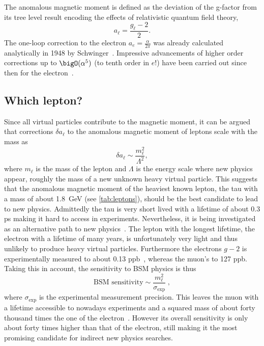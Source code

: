 The anomalous magnetic moment is defined as the deviation of the g-factor from its tree level result encoding the effects of relativistic quantum field theory,
\begin{equation}
a_{\ell} = \frac{g_{\ell}-2}{2}.
\end{equation}
The one-loop correction to the electron $a_{e} = \frac{\alpha}{2 \pi}$ was already calculated analytically in 1948 by Schwinger~\cite{Schwinger:1948}.
Impressive advancements of higher order corrections up to $\bigO(\alpha^{5})$ (\ie to tenth order in $e$!) have been carried out since then for the electron~\cite{laporta1996analytical,PhysRevLett.109.111807,PhysRevD.91.033006,nio2015qed}.

\subsection{Which lepton?}

Since all virtual particles contribute to the magnetic moment, it can be argued~\cite{osti_4382322} that corrections $\delta a_{\ell}$ to the anomalous magnetic moment of leptons scale with the mass as
\begin{equation}
\delta a_{\ell} \sim \frac{m_{\ell}^{2}}{\Lambda^{2}},
\end{equation}
where $m_{\ell}$ is the mass of the lepton and $\Lambda$ is the energy scale where new physics appear, \ie roughly the mass of a new unknown heavy virtual particle.
This suggests that the anomalous magnetic moment of the heaviest known lepton, the tau with a mass of about \SI{1.8}{\GeV} (see \cref{tab:leptons}), should be the best candidate to lead to new physics.
Admittedly the tau is very short lived with a lifetime of about \num{0.3} ps making it hard to access in experiments.
Nevertheless, it is being investigated as an alternative path to new physics~\cite{Fael:2013ij,BaBar:2015ard}.
The lepton with the longest lifetime, the electron with a lifetime of many years, is unfortunately very light and thus unlikely to produce heavy virtual particles.
Furthermore the electrons $g-2$ is experimentally measured to about \num{0.13} ppb~\cite{Fan:2022eto}, whereas the muon's to \num{127} ppb\cite{Muong-2:2025xyk}.
Taking this in account, the sensitivity to BSM physics is thus
\begin{equation}
\text{BSM sensitivity} \sim \frac{m_{\ell}^{2}}{\sigma_{\text{exp}}} \;,
\end{equation}
where $\sigma_{\text{exp}}$ is the experimental measurement precision.
This leaves the muon with a lifetime accessible to nowadays experiments and a squared mass of about forty thousand times the one of the electron~\cite{jegerlehner2009muon}.
However its overall sensitivity is only about forty times higher than that of the electron, still making it the most promising candidate for indirect new physics searches.

